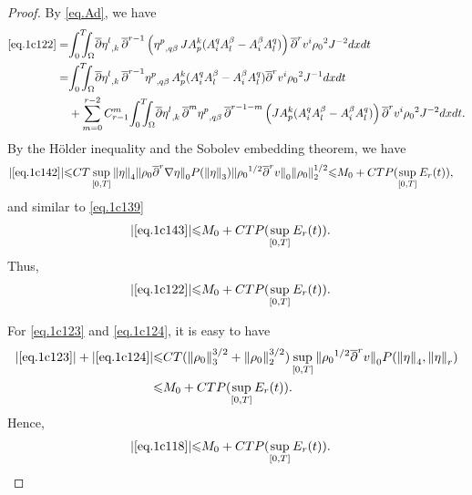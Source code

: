 \documentclass[12pt,twoside,reqno]{amsart}
\numberwithin{equation}{section}
\theoremstyle{definition}
\theoremstyle{remark}
\begin{document}
\begin{proof}
By \eqref{eq.Ad}, we have
\begin{align}
  \eqref{eq.1c122}=&{\int_0^T\!\!\!\!\int_\Omega }  {\overline{\partial}} {{{\eta^l}}_{,{k}}\,}{\overline{\partial}}^{r-1}\left({{{\eta^p}}_{,{q\beta}}\,}JA^k_p(A^q_iA^\beta_l-A^\beta_iA^q_l)\right) {\overline{\partial}}^r v^i{\rho_0}^2  J^{-2}dxdt{\nonumber}\\
  =&{\int_0^T\!\!\!\!\int_\Omega }  {\overline{\partial}} {{{\eta^l}}_{,{k}}\,}{\overline{\partial}}^{r-1}{{{\eta^p}}_{,{q\beta}}\,}A^k_p(A^q_iA^\beta_l-A^\beta_iA^q_l){\overline{\partial}}^r v^i{\rho_0}^2  J^{-1}dxdt\label{eq.1c142}\\
  &+\sum_{m=0}^{r-2}C_{r-1}^m{\int_0^T\!\!\!\!\int_\Omega }  {\overline{\partial}} {{{\eta^l}}_{,{k}}\,}{\overline{\partial}}^m{{{\eta^p}}_{,{q\beta}}\,}{\overline{\partial}}^{r-1-m} \left(JA^k_p(A^q_iA^\beta_l-A^\beta_iA^q_l)\right){\overline{\partial}}^r v^i{\rho_0}^2  J^{-2}dxdt.\label{eq.1c143}
\end{align}
By the H\"older inequality and the Sobolev embedding theorem, we have
\begin{align*}
  {\vert{\eqref{eq.1c142}}\vert}{\leqslant}&CT\sup_{[0,T]}{\Vert{\eta}\Vert}_4{\Vert{{\rho_0} {\overline{\partial}}^r{\nabla}\eta}\Vert}_0 P({\Vert{\eta}\Vert}_3){\Vert{{\rho_0}^{1/2}{\overline{\partial}}^rv}\Vert}_0{\Vert{\rho_0}\Vert}_2^{1/2}
  {\leqslant} M_0+CTP(\sup_{[0,T]}E_r(t)),
\end{align*}
and similar to \eqref{eq.1c139}
\begin{align*}
  {\vert{\eqref{eq.1c143}}\vert}{\leqslant}&M_0+CTP(\sup_{[0,T]}E_r(t)).
\end{align*}
Thus,
\begin{align}
  {\vert{\eqref{eq.1c122}}\vert}{\leqslant} &M_0+CTP(\sup_{[0,T]}E_r(t)).
\end{align}

For \eqref{eq.1c123} and \eqref{eq.1c124}, it is easy to have
\begin{align*}
  {\vert{\eqref{eq.1c123}}\vert}+{\vert{\eqref{eq.1c124}}\vert}
  {\leqslant}&CT({\Vert{\rho_0}\Vert}_3^{3/2}+{\Vert{\rho_0}\Vert}_2^{3/2})\sup_{[0,T]} {\Vert{{\rho_0}^{1/2}{\overline{\partial}}^rv}\Vert}_0P({\Vert{\eta}\Vert}_4,{\Vert{\eta}\Vert}_r)\\
  {\leqslant}& M_0+CTP(\sup_{[0,T]}E_r(t)).
\end{align*}
Hence,
\begin{align}
  {\vert{\eqref{eq.1c118}}\vert}{\leqslant} &M_0+CTP(\sup_{[0,T]}E_r(t)).
\end{align}


\end{proof}
\end{document}
